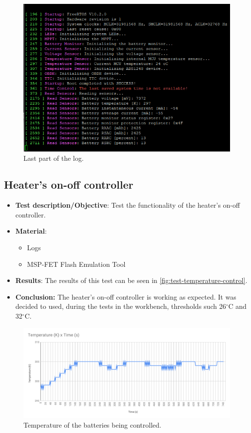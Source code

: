 \begin{figure}[!ht]
    \begin{center}
        \includegraphics[width=0.7\columnwidth]{figures/ds2777g_log_3.png}
        \caption{Last part of the log.}
        \label{fig:test-battery-monitor-3}
    \end{center}
\end{figure}

\subsection{Heater's on-off controller}

\begin{itemize}
    \item \textbf{Test description/Objective}: Test the functionality of the heater's on-off controller.
    \item \textbf{Material}:
        \begin{itemize}
            \item Logs
            \item MSP-FET Flash Emulation Tool
        \end{itemize}
    \item \textbf{Results}: The results of this test can be seen in \autoref{fig:test-temperature-control}.
    \item \textbf{Conclusion:} The heater's on-off controller is working as expected. It was decided to used, during the tests in the workbench, thresholds such 26$^{\circ}$C and 32$^{\circ}$C.  
\end{itemize}

\begin{figure}[!ht]
    \begin{center}
        \includegraphics[width=\columnwidth]{figures/heater_controller.pdf}
        \caption{Temperature of the batteries being controlled.}
        \label{fig:test-temperature-control}
    \end{center}
\end{figure}

